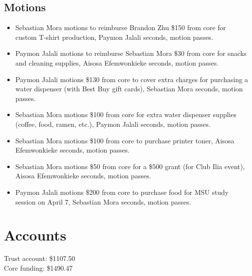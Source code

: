 \documentclass[12pt]{article}
\begin{document}
\subsection*{Motions}
\begin{itemize}
\item Sebastian Mora motions to reimburse Brandon Zhu \$150 from core for custom T-shirt production, Paymon Jalali seconds, motion passes.
\item Paymon Jalali motions to reimburse Sebastian Mora \$30 from core for snacks and cleaning supplies, Aisosa Efemwonkieke seconds, motion passes.
\item Paymon Jalali motions \$130 from core to cover extra charges for purchasing a water dispenser (with Best Buy gift cards), Sebastian Mora seconds, motion passes.
\item Sebastian Mora motions \$100 from core for extra water dispenser supplies (coffee, food, ramen, etc.), Paymon Jalali seconds, motion passes.
\item Sebastian Mora motions \$100 from core to purchase printer toner, Aisosa Efemwonkieke seconds, motion passes.
\item Sebastian Mora motions \$50 from core for a \$500 grant (for Club Ilia event), Aisosa Efemwonkieke seconds, motion passes.
\item Paymon Jalali motions \$200 from core to purchase food for MSU study session on April 7, Sebastian Mora seconds, motion passes.
\end{itemize}

\section*{Accounts}
Trust account: \$1107.50 \\
Core funding: \$1490.47 \\
\end{document}
